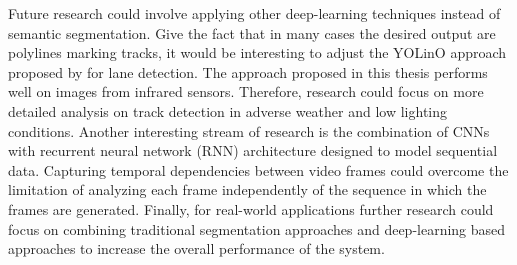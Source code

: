 \documentclass[Master,MDS,english]{BASE/twbook} %
\begin{document}
Future research could involve applying other deep-learning techniques instead of semantic segmentation. Give the fact that in many cases the desired output are polylines marking tracks, it would be interesting to adjust the YOLinO approach proposed by \cite{meyer2021yolino} for lane detection. %
The approach proposed in this thesis performs well on images from infrared sensors. Therefore, research could focus on more detailed analysis on track detection in adverse weather and low lighting conditions. Another interesting stream of research is the combination of CNNs with recurrent neural network (RNN) architecture designed to model sequential data. Capturing temporal dependencies between video frames  could overcome the limitation of analyzing each frame independently of the sequence in which the frames are generated. Finally, for real-world applications further research could focus on combining traditional segmentation approaches and deep-learning based approaches to increase the overall performance of the system.










\clearpage                                                       %


\clearpage

\listoffigures                                                   %
\clearpage

\listoftables                                                    %
\clearpage

    
\end{document}
